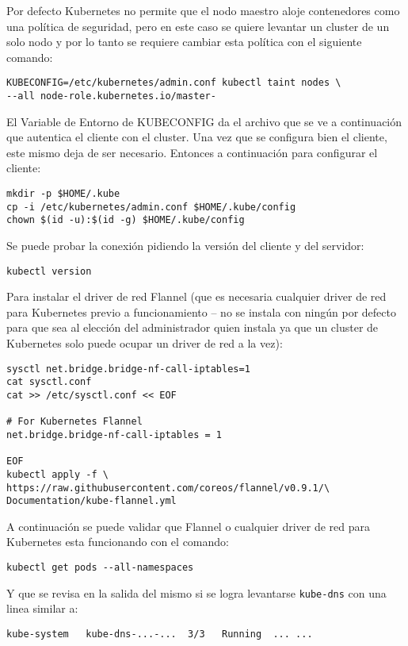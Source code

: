 Por defecto Kubernetes no permite que el nodo maestro aloje contenedores como una política de seguridad, pero en este caso se quiere levantar un cluster de un solo nodo y por lo tanto se requiere cambiar esta política con el siguiente comando:
    \begin{lstlisting}
KUBECONFIG=/etc/kubernetes/admin.conf kubectl taint nodes \
--all node-role.kubernetes.io/master-
    \end{lstlisting}
El Variable de Entorno de KUBECONFIG da el archivo que se ve a continuación que autentica el cliente con el cluster. Una vez que se configura bien el cliente, este mismo deja de ser necesario. Entonces a continuación para configurar el cliente:
    \begin{lstlisting}
mkdir -p $HOME/.kube
cp -i /etc/kubernetes/admin.conf $HOME/.kube/config
chown $(id -u):$(id -g) $HOME/.kube/config
    \end{lstlisting}

Se puede probar la conexión pidiendo la versión del cliente y del servidor:
\begin{lstlisting}
kubectl version
\end{lstlisting}

Para instalar el driver de red Flannel (que es necesaria cualquier driver de red para Kubernetes previo a funcionamiento -- no se instala con ningún por defecto para que sea al elección del administrador quien instala ya que un cluster de Kubernetes solo puede ocupar un driver de red a la vez):
\begin{lstlisting}
sysctl net.bridge.bridge-nf-call-iptables=1
cat sysctl.conf
cat >> /etc/sysctl.conf << EOF

# For Kubernetes Flannel
net.bridge.bridge-nf-call-iptables = 1

EOF
kubectl apply -f \
https://raw.githubusercontent.com/coreos/flannel/v0.9.1/\
Documentation/kube-flannel.yml
\end{lstlisting}

A continuación se puede validar que Flannel o cualquier driver de red para Kubernetes esta funcionando con el comando:
\begin{lstlisting}
kubectl get pods --all-namespaces
\end{lstlisting}
Y que se revisa en la salida del mismo si se logra levantarse \texttt{kube-dns} con una linea similar a:
\begin{lstlisting}
kube-system   kube-dns-...-...  3/3   Running  ... ...
\end{lstlisting}

